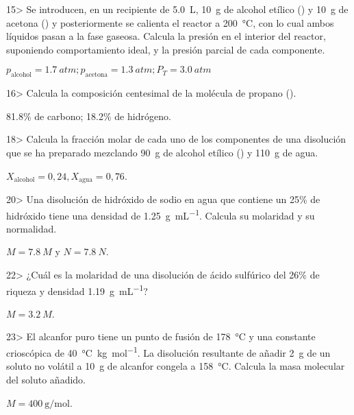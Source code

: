\documentclass[10pt]{article}
\begin{document}
\begin{multicols}{2}
\begin{exercise}
  15> Se introducen, en un recipiente de \SI{5.0}{\liter}, \SI{10}{\gram} de alcohol etílico () y \SI{10}{\gram} de acetona () y posteriormente se calienta el reactor a \SI{200}{\celsius}, con lo cual
  ambos líquidos pasan a la fase gaseosa. Calcula la presión en el interior del reactor, suponiendo comportamiento ideal, y la presión parcial de cada componente.
\end{exercise}
\begin{solution}
  $p_\textrm{alcohol} = \SI{1.7}{atm}; p_\textrm{acetona} = \SI{1.3}{atm} ; P_T = \SI{3.0}{atm}$
\end{solution}

\begin{exercise}
  16> Calcula la composición centesimal de la molécula de propano ().
\end{exercise}
\begin{solution}
  \num{81,8}\% de carbono; \num{18,2}\% de hidrógeno.
\end{solution}

\begin{exercise}
  18> Calcula la fracción molar de cada uno de los componentes
  de una disolución que se ha preparado mezclando \SI{90}{\gram} de alcohol etílico () y \SI{110}{\gram} de agua.
\end{exercise}
\begin{solution}
  $X_\textrm{alcohol} = 0,24, X_\textrm{agua} = 0,76$.
\end{solution}

\begin{exercise}
  20> Una disolución de hidróxido de sodio en agua que contiene un 25\% de hidróxido tiene una densidad de \SI{1.25}{\gram\per\milli\liter}. Calcula
  su molaridad y su normalidad.
\end{exercise}
\begin{solution}
  $M = \SI{7.8}{M}$ y $N = \SI{7.8}{N}$.
\end{solution}

\begin{exercise}
  22> ¿Cuál es la molaridad de una disolución de ácido sulfúrico
  del 26\% de riqueza y densidad \SI{1.19}{\gram\per\milli\liter}?
\end{exercise}
\begin{solution}
  $M = \SI{3.2}{M}$.
\end{solution}

\begin{exercise}
  23> El alcanfor puro tiene un punto de fusión de \SI{178}{\celsius} y una constante crioscópica de \SI{40}{\celsius\kilo\gram\per\mole}. La disolución resultante de añadir \SI{2}{\gram} de un soluto no volátil a
  \SI{10}{\gram} de alcanfor congela a \SI{158}{\celsius}. Calcula la masa molecular del soluto añadido.
\end{exercise}
\begin{solution}
  $M = \SI{400}{\gram\per\mole}$.
\end{solution}


\end{multicols}
\end{document}
